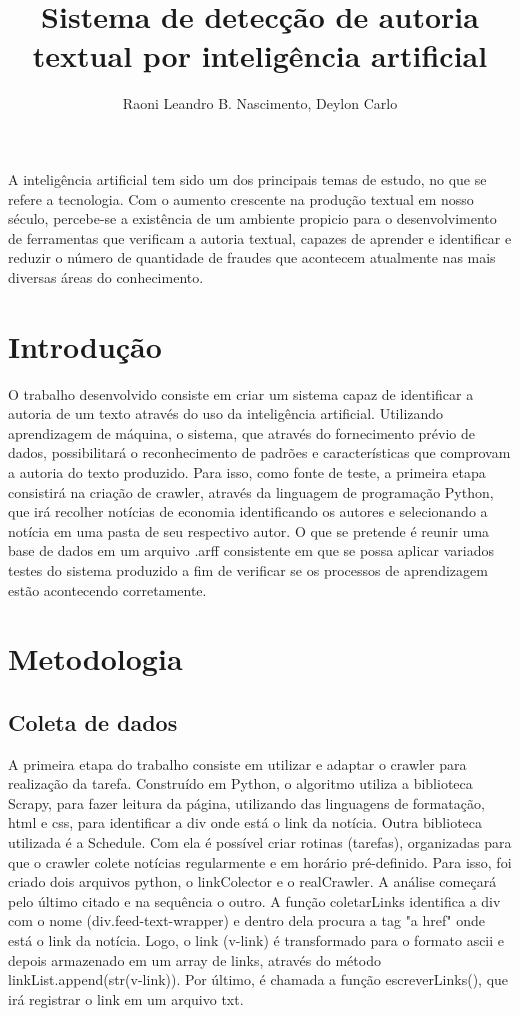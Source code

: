 \documentclass[12pt]{article}
\title{Sistema de detecção de autoria textual por inteligência artificial}
\author{Raoni Leandro B. Nascimento\inst{1}, Deylon Carlo\inst{2} }
\begin{document}
 

\maketitle

\begin{resumo} 
A inteligência artificial tem sido um dos principais temas de estudo, no que se refere a tecnologia. Com o aumento crescente na produção textual em nosso século, percebe-se a existência de um ambiente propicio para o desenvolvimento de ferramentas que verificam a autoria textual, capazes de aprender e identificar e reduzir o número de quantidade de fraudes que acontecem atualmente nas mais diversas áreas do conhecimento.  
 
\end{resumo}

\section{Introdução}
O trabalho desenvolvido consiste em criar um sistema capaz de identificar a autoria de um texto através do uso da inteligência artificial. Utilizando aprendizagem de máquina, o sistema, que através do fornecimento prévio de dados, possibilitará o reconhecimento de padrões e características que comprovam a autoria do texto produzido. Para isso, como fonte de teste, a primeira etapa consistirá na criação de crawler, através da linguagem de programação Python, que irá recolher notícias de economia identificando os autores e selecionando a notícia em uma pasta de seu respectivo autor. O que se pretende é reunir uma base de dados em um arquivo .arff consistente em que se possa aplicar variados testes do sistema produzido a fim de verificar se os processos de aprendizagem estão acontecendo corretamente.     

\section{Metodologia} \label{sec:firstpage}

\subsection{Coleta de dados}
A primeira etapa do trabalho consiste em utilizar e adaptar o crawler para realização da tarefa. Construído em Python, o algoritmo utiliza a biblioteca Scrapy, para fazer leitura da página, utilizando das linguagens de formatação, html e css, para identificar a div onde está o link da notícia. Outra biblioteca utilizada é a Schedule. Com ela é possível criar rotinas (tarefas), organizadas para que o crawler colete notícias regularmente e em horário pré-definido. Para isso, foi criado dois arquivos python, o linkColector e o  realCrawler. A análise começará pelo último citado e na sequência o outro.
A função coletarLinks identifica a div com o nome (div.feed-text-wrapper) e dentro dela procura a tag "a href" onde está o link da notícia. Logo, o link (v-link) é transformado para o formato ascii e depois armazenado em um array de links, através do método linkList.append(str(v-link)).
 Por último, é chamada a função escreverLinks(), que irá registrar o link em um arquivo txt.
 
\end{document}
